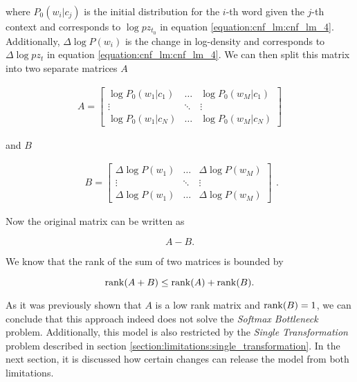 where $ P_0(w_i | c_j) $ is the initial distribution for the $ i $-th word given the $ j $-th context and corresponds to $ \log pz_{t_0} $ in equation \ref{equation:cnf_lm:cnf_lm_4}. Additionally, $ \Delta \log P(w_i) $ is the change in log-density and corresponds to $ \Delta \log pz_t $ in equation \ref{equation:cnf_lm:cnf_lm_4}. We can then split this matrix into two separate matrices $ A $ 

\begin{displaymath}
    \begin{matrix}
    A = \begin{bmatrix}
       \log P_0(w_1 | c_1) & \hdots & \log P_0(w_M | c_1) \\
       \vdots & \ddots & \vdots \\
       \log P_0(w_1 | c_N) & \hdots & \log P_0(w_M | c_N)
      \end{bmatrix}
    \end{matrix}
\end{displaymath}

and $ B $

\begin{displaymath}
    \begin{matrix}
    B = \begin{bmatrix}
       \Delta \log P(w_1) & \hdots & \Delta \log P(w_M) \\
       \vdots & \ddots & \vdots \\
       \Delta \log P(w_1) & \hdots & \Delta \log P(w_M)
      \end{bmatrix}
    \end{matrix}.
\end{displaymath}

Now the original matrix can be written as

\begin{displaymath}
    A - B.
\end{displaymath}

We know that the rank of the sum of two matrices is bounded by

\begin{displaymath}
    \operatorname{rank}(A + B) \leq \operatorname{rank}(A) + \operatorname{rank}(B).
\end{displaymath}

As it was previously shown that $ A $ is a low rank matrix and $ \operatorname{rank}(B) = 1 $, we can conclude that this approach indeed does not solve the \emph{Softmax Bottleneck} problem. Additionally, this model is also restricted by the \emph{Single Transformation} problem described in section \ref{section:limitations:single_transformation}. In the next section, it is discussed how certain changes can release the model from both limitations.

